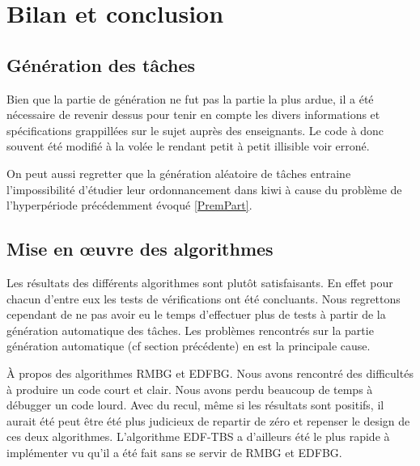 \chapter{Bilan et conclusion}
\section{Génération des tâches}
Bien que la partie de génération ne fut pas la partie la plus ardue, il a été nécessaire de revenir dessus pour tenir en compte les divers informations et spécifications grappillées sur le sujet auprès des enseignants. Le code à donc souvent été modifié à la volée le rendant petit à petit illisible voir erroné.

On peut aussi regretter que la génération aléatoire de tâches entraine l'impossibilité d'étudier leur ordonnancement dans kiwi à cause du problème de l'hyperpériode précédemment évoqué \ref{PremPart}.


\section{Mise en œuvre des algorithmes}
Les résultats des différents algorithmes sont plutôt satisfaisants. En effet pour chacun d'entre eux les tests de vérifications ont été concluants. Nous regrettons cependant de ne pas avoir eu le temps d'effectuer plus de tests à partir de la génération automatique des tâches. Les problèmes rencontrés sur la partie génération automatique (cf section précédente) en est la principale cause.

\`A propos des algorithmes RMBG et EDFBG. Nous avons rencontré des difficultés à produire un code court et clair. Nous avons perdu beaucoup de temps à débugger un code lourd. Avec du recul, même si les résultats sont positifs, il aurait été peut être été plus judicieux de repartir de zéro et repenser le design de ces deux algorithmes.  L'algorithme EDF-TBS a d'ailleurs été le plus rapide à implémenter vu qu'il a été fait sans se servir de RMBG et EDFBG.

